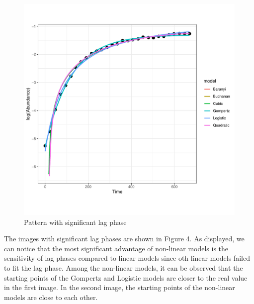 \documentclass[11pt, oneside]{article}
\begin{document}
\begin{figure}[H]
\begin{center}
\begin{minipage}{.5\textwidth}
				\includegraphics[page=118, scale = 0.5]{plot_subsets.pdf}
			\end{minipage}
			\end{center}
		\caption{Pattern with significant lag phase}
		\end{figure}
		
		\noindent The images with significant lag phases are shown in Figure 4. As displayed, we can notice that the most significant advantage of non-linear models is the sensitivity of lag phases compared to linear models since oth linear models failed to fit the lag phase. Among the non-linear models, it can be observed that the starting points of the Gompertz and Logistic models are closer to the real value in the first image. In the second image, the starting points of the non-linear models are close to each other.
\end{document}
